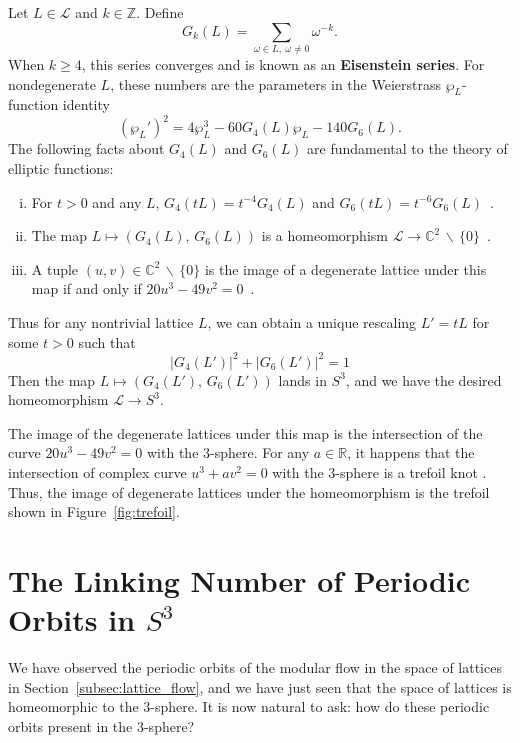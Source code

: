 \documentclass[12pt,twoside]{reedthesis}
\theoremstyle{definition}
\newcommand{\Z}{\mathbb{Z}}
\newcommand{\R}{\mathbb{R}}
\newcommand{\C}{\mathbb{C}}
\newcommand{\LS}{\mathcal{L}}
\newcommand{\wo}{\, \backslash \,}
\newcommand{\defnphrase}[1]{\textbf{#1}}
\begin{document}
Let $L \in \LS$ and $k \in \Z$.
Define
\begin{equation*}
  G_k(L) = \sum_{\omega \in L,\ \omega \neq 0} \omega^{-k}.
\end{equation*}
When $k \geq 4$, this series converges and is known as an \defnphrase{Eisenstein series}.
For nondegenerate $L$, these numbers are the parameters in the Weierstrass $\wp_L$-function identity
\begin{equation*}
  (\wp_L')^2 = 4 \wp_L^3 - 60 G_4(L) \wp_L - 140 G_6(L).
\end{equation*}
The following facts about $G_4(L)$ and $G_6(L)$ are fundamental to the theory of elliptic functions:
\begin{enumerate}[(i)]
  \item For $t > 0$ and any $L$, $G_4(tL) = t^{-4} G_4(L)$ and $G_6(tL) = t^{-6} G_6(L)$~\cite[631]{abramowitz1964}.
  
  \item The map $L \mapsto (G_4(L),\, G_6(L))$ is a homeomorphism $\LS \to \C^2 \wo \{ 0 \}$~\cite[82, 89]{serre1973}.

  \item A tuple $(u, v) \in \C^2 \wo \{ 0 \}$ is the image of a degenerate lattice under this map if and only if $20u^3 - 49v^2 = 0$~\cite[265]{ghys2007}.
\end{enumerate}
Thus for any nontrivial lattice $L$, we can obtain a unique rescaling $L' = tL$ for some $t > 0$ such that
\begin{equation*}
  |G_4(L')|^2 + |G_6(L')|^2 = 1
\end{equation*}
Then the map $L \mapsto (G_4(L'),\, G_6(L'))$ lands in $S^3$, and we have the desired homeomorphism $\LS \to S^3$.

The image of the degenerate lattices under this map is the intersection of the curve $20u^3 - 49v^2 = 0$ with the 3-sphere. For any $a \in \R$, it happens that the intersection of complex curve $u^3 + av^2 = 0$ with the 3-sphere is a trefoil knot \cite[4]{milnor1968}. Thus, the image of degenerate lattices under the homeomorphism is the trefoil shown in Figure~\ref{fig:trefoil}.

\section{The Linking Number of Periodic Orbits in $S^3$}\label{sec:periodic_orbits_in_s3}

We have observed the periodic orbits of the modular flow in the space of lattices in Section~\ref{subsec:lattice_flow}, and we have just seen that the space of lattices is homeomorphic to the 3-sphere.
It is now natural to ask: how do these periodic orbits present in the 3-sphere?
\end{document}

